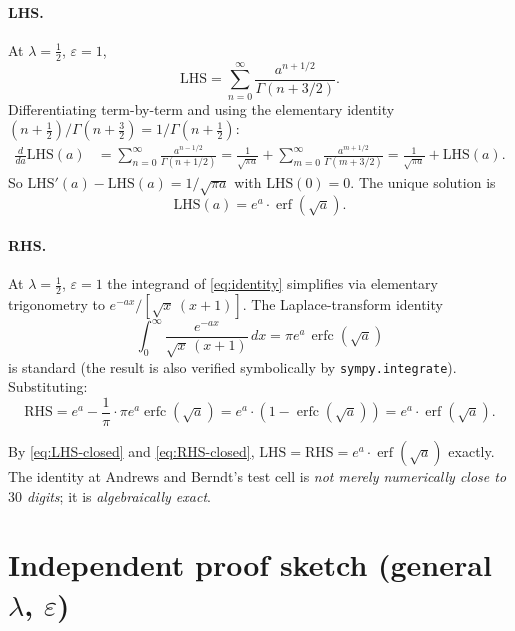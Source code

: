 \documentclass[11pt,reqno]{amsart}
\theoremstyle{definition}
\DeclareMathOperator{\erf}{erf}
\DeclareMathOperator{\erfc}{erfc}
\newcommand{\LHS}{\mathrm{LHS}}
\newcommand{\RHS}{\mathrm{RHS}}
\begin{document}
\paragraph{LHS.} At $\lambda = \tfrac12$, $\varepsilon = 1$,
\begin{equation}
\LHS = \sum_{n=0}^\infty \frac{a^{n + 1/2}}{\Gamma(n + 3/2)}.
\end{equation}
Differentiating term-by-term and using the elementary identity
$(n + \tfrac12)/\Gamma(n + \tfrac32) = 1/\Gamma(n + \tfrac12)$:
\begin{align*}
\tfrac{d}{da}\LHS(a)
&= \sum_{n=0}^\infty \frac{a^{n - 1/2}}{\Gamma(n + 1/2)}
= \frac{1}{\sqrt{\pi a}}
+ \sum_{m=0}^\infty \frac{a^{m + 1/2}}{\Gamma(m + 3/2)}
= \frac{1}{\sqrt{\pi a}} + \LHS(a).
\end{align*}
So $\LHS'(a) - \LHS(a) = 1/\sqrt{\pi a}$ with $\LHS(0) = 0$. The
unique solution is
\begin{equation}\label{eq:LHS-closed}
\LHS(a) = e^a \cdot \erf(\sqrt{a}).
\end{equation}

\paragraph{RHS.} At $\lambda = \tfrac12$, $\varepsilon = 1$ the integrand of \cref{eq:identity} simplifies via elementary trigonometry to
$e^{-ax} / [\sqrt{x}\,(x + 1)]$. The Laplace-transform identity
\begin{equation}\label{eq:Laplace}
\int_0^\infty \frac{e^{-ax}}{\sqrt{x}\,(x + 1)}\,dx
= \pi e^a \, \erfc(\sqrt{a})
\end{equation}
is standard \cite[3.466.1]{GradshteynRyzhik} (the result is also
verified symbolically by \texttt{sympy.integrate}). Substituting:
\begin{equation}\label{eq:RHS-closed}
\RHS = e^a - \frac{1}{\pi} \cdot \pi e^a \erfc(\sqrt{a})
= e^a \cdot (1 - \erfc(\sqrt{a}))
= e^a \cdot \erf(\sqrt{a}).
\end{equation}

By \cref{eq:LHS-closed} and \cref{eq:RHS-closed},
$\LHS = \RHS = e^a \cdot \erf(\sqrt{a})$ exactly. The identity at
Andrews and Berndt's test cell is \emph{not merely numerically close
to $30$ digits}; it is \emph{algebraically exact}.

\section{Independent proof sketch (general $\lambda$, $\varepsilon$)}\label{sec:contourproof}
\end{document}

